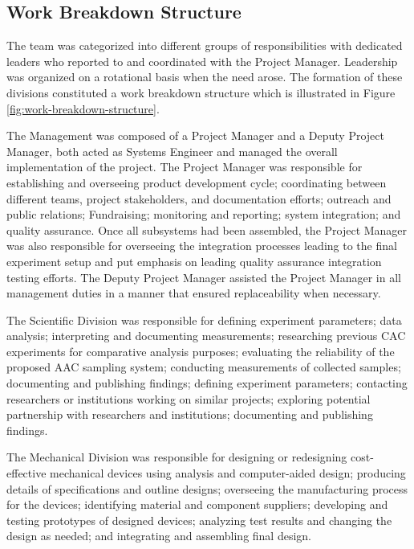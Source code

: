 
\subsection{Work Breakdown Structure}

The team was categorized into different groups of responsibilities with dedicated leaders who reported to and coordinated with the Project Manager. Leadership was organized on a rotational basis when the need arose. The formation of these divisions constituted a work breakdown structure which is illustrated in Figure \ref{fig:work-breakdown-structure}.

The Management was composed of a Project Manager and a Deputy Project Manager, both acted as Systems Engineer and managed the overall implementation of the project. The Project Manager was responsible for establishing and overseeing product development cycle; coordinating between different teams, project stakeholders, and documentation efforts; outreach and public relations; Fundraising; monitoring and reporting; system integration; and quality assurance. Once all subsystems had been assembled, the Project Manager was also responsible for overseeing the integration processes leading to the final experiment setup and put emphasis on leading quality assurance integration testing efforts. The Deputy Project Manager assisted the Project Manager in all management duties in a manner that ensured replaceability when necessary.

The Scientific Division was responsible for defining experiment parameters; data analysis; interpreting and documenting measurements; researching previous CAC experiments for comparative analysis purposes; evaluating the reliability of the proposed AAC sampling system; conducting measurements of collected samples; documenting and publishing findings; defining experiment parameters; contacting researchers or institutions working on similar projects; exploring potential partnership with researchers and institutions; documenting and publishing findings.

The Mechanical Division was responsible for designing or redesigning cost-effective mechanical devices using analysis and computer-aided design; producing details of specifications and outline designs; overseeing the manufacturing process for the devices; identifying material and component suppliers; developing and testing prototypes of designed devices; analyzing test results and changing the design as needed; and integrating and assembling final design.

